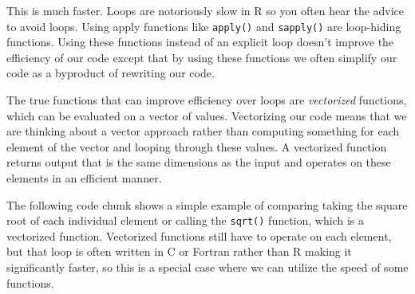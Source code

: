 \documentclass[
  letterpaper,
]{latex/krantz}
\makeatletter
\newenvironment{Shaded}{\begin{snugshade}}{\end{snugshade}}
\newcommand{\AttributeTok}[1]{\textcolor[rgb]{0.40,0.45,0.13}{#1}}
\newcommand{\CommentTok}[1]{\textcolor[rgb]{0.37,0.37,0.37}{#1}}
\newcommand{\FunctionTok}[1]{\textcolor[rgb]{0.28,0.35,0.67}{#1}}
\newcommand{\NormalTok}[1]{\textcolor[rgb]{0.00,0.23,0.31}{#1}}
\newcommand{\OtherTok}[1]{\textcolor[rgb]{0.00,0.23,0.31}{#1}}
\newcommand{\SpecialCharTok}[1]{\textcolor[rgb]{0.37,0.37,0.37}{#1}}
\newcommand{\StringTok}[1]{\textcolor[rgb]{0.13,0.47,0.30}{#1}}
\newenvironment{kframe}{%
\medskip{}
\setlength{\fboxsep}{.8em}
 \def\at@end@of@kframe{}%
 \ifinner\ifhmode%
  \def\at@end@of@kframe{\end{minipage}}%
  \begin{minipage}{\columnwidth}%
 \fi\fi%
 \def\FrameCommand##1{\hskip\@totalleftmargin \hskip-\fboxsep
 \colorbox{shadecolor}{##1}\hskip-\fboxsep
     \hskip-\linewidth \hskip-\@totalleftmargin \hskip\columnwidth}%
 \MakeFramed {\advance\hsize-\width
   \@totalleftmargin\z@ \linewidth\hsize
   \@setminipage}}%
 {\par\unskip\endMakeFramed%
 \at@end@of@kframe}
\renewenvironment{Shaded}{\begin{kframe}}{\end{kframe}}
\makeatother
\begin{document}
\begin{Shaded}
\end{Shaded}

This is much faster. Loops are notoriously slow in R so you often hear
the advice to avoid loops. Using apply functions like
\texttt{apply()} and \texttt{sapply()} are loop-hiding
functions.
Using these functions instead of an explicit loop doesn't improve the
efficiency of our code except that by using these functions we often
simplify our code as a byproduct of rewriting our code.

The true functions that can improve efficiency over loops are
\emph{vectorized} functions, which can be evaluated on a vector of
values. Vectorizing our code means that we are thinking about a vector
approach rather than computing something for each element of the vector
and looping through these values. A vectorized function returns output
that is the same dimensions as the input and operates on these elements
in an efficient manner.

The following code chunk shows a simple example of comparing taking the
square root of each individual element or calling the \texttt{sqrt()}
function, which is a vectorized function. Vectorized functions still
have to operate on each element, but that loop is often written in C or
Fortran rather than R making it significantly faster, so this is a
special case where we can utilize the speed of some functions.
\end{document}
